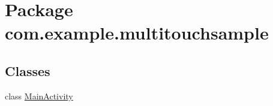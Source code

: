 \hypertarget{namespacecom_1_1example_1_1multitouchsample}{}\section{Package com.\+example.\+multitouchsample}
\label{namespacecom_1_1example_1_1multitouchsample}
\subsection*{Classes}
\begin{DoxyCompactItemize}
\item 
class \hyperlink{classcom_1_1example_1_1multitouchsample_1_1_main_activity}{Main\+Activity}
\end{DoxyCompactItemize}

